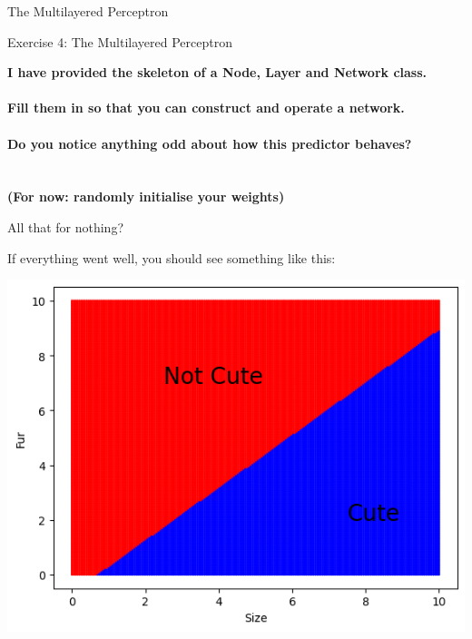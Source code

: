\documentclass[]{SangerLibrary/sanger-present}
\renewcommand\vec[1]{\boldsymbol{\mathbf{#1}}}
\begin{document}
{\begin{frame}{The Multilayered Perceptron}
	\end{frame}
	}

	\begin{frame}{Exercise 4: The Multilayered Perceptron}
	
		\begin{center}
			\bf I have provided the skeleton of a Node, Layer and Network class. 
			\\
			~
			\\
			\pause Fill them in so that you can construct and operate a network. 
			\\
			~
			\\
			\pause Do you notice anything odd about how this predictor behaves?
			\\
			~
			\\
			~
			\\
			\pause (For now: randomly initialise your weights)
		\end{center}
	\end{frame}

	\begin{frame}{All that for nothing?}
	
		If everything went well, you should see something like this:

		\includegraphics[width=\linewidth,height=0.8\paperheight,keepaspectratio=true]{LinearMLP.png}
	\end{frame}
\end{document}
